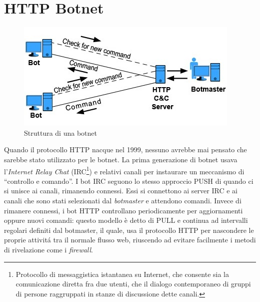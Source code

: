 \vspace*{1cm}
\section{HTTP Botnet}
\begin{figure}[\textit{h}]
        \centering
		\includegraphics[width=0.5\linewidth]{./imgs/botnet1999}
        \caption{Struttura di una botnet}
        \label{strutturabotnet}
\end{figure}
Quando il protocollo HTTP nacque nel 1999, nessuno avrebbe mai pensato che sarebbe stato utilizzato per le botnet. 
La prima generazione di botnet usava l'\textit{Internet Relay Chat} (IRC\footnote{Protocollo di messaggistica istantanea su Internet, che consente sia la comunicazione diretta fra due utenti, che il dialogo contemporaneo di gruppi di persone raggruppati in stanze di discussione dette canali.}) e relativi canali per instaurare un meccanismo di ``controllo e comando''. I bot IRC seguono lo stesso approccio PUSH di quando ci si unisce ai canali, rimanendo connessi. Essi si connettono ai server IRC e ai canali che sono stati selezionati dal \textit{botmaster} e attendono comandi. 
Invece di rimanere connessi, i bot HTTP controllano periodicamente per aggiornamenti oppure nuovi comandi: questo modello \`e detto di PULL e continua ad intervalli regolari definiti dal botmaster, il quale, usa il protocollo HTTP per nascondere le proprie attivit\'a tra il normale flusso web, riuscendo ad evitare facilmente i metodi di rivelazione come i \textit{firewall}. 

\vspace*{1cm}
